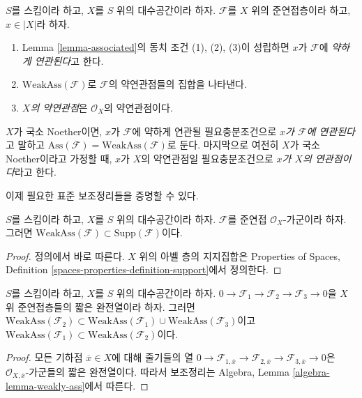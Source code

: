 \begin{definition}
\label{definition-weakly-associated}
$S$를 스킴이라 하고, $X$를 $S$ 위의 대수공간이라 하자.
$\mathcal{F}$를 $X$ 위의 준연접층이라 하고, $x \in |X|$라 하자.
\begin{enumerate}
\item Lemma \ref{lemma-associated}의 동치 조건 (1), (2), (3)이
성립하면 $x$가 $\mathcal{F}$에 {\it 약하게 연관된다}고 한다.
\item $\text{WeakAss}(\mathcal{F})$로 $\mathcal{F}$의
약연관점들의 집합을 나타낸다.
\item {\it $X$의 약연관점}은 $\mathcal{O}_X$의 약연관점이다.
\end{enumerate}
$X$가 국소 Noether이면, $x$가 $\mathcal{F}$에 약하게 연관될 필요충분조건으로
{\it $x$가 $\mathcal{F}$에 연관된다}고 말하고
$\text{Ass}(\mathcal{F}) = \text{WeakAss}(\mathcal{F})$로 둔다.
마지막으로 여전히 $X$가 국소 Noether이라고 가정할 때,
$x$가 $X$의 약연관점일 필요충분조건으로
{\it $x$가 $X$의 연관점이다}라고 한다.
\end{definition}

\noindent
이제 필요한 표준 보조정리들을 증명할 수 있다.

\begin{lemma}
\label{lemma-weakly-ass-support}
$S$를 스킴이라 하고, $X$를 $S$ 위의 대수공간이라 하자.
$\mathcal{F}$를 준연접 $\mathcal{O}_X$-가군이라 하자. 그러면
$\text{WeakAss}(\mathcal{F}) \subset \text{Supp}(\mathcal{F})$이다.
\end{lemma}

\begin{proof}
정의에서 바로 따른다. $X$ 위의 아벨 층의 지지집합은
Properties of Spaces, Definition
\ref{spaces-properties-definition-support}에서 정의한다.
\end{proof}

\begin{lemma}
\label{lemma-ses-weakly-ass}
$S$를 스킴이라 하고, $X$를 $S$ 위의 대수공간이라 하자.
$0 \to \mathcal{F}_1 \to \mathcal{F}_2 \to \mathcal{F}_3 \to 0$을
$X$ 위 준연접층들의 짧은 완전열이라 하자. 그러면
$\text{WeakAss}(\mathcal{F}_2) \subset
\text{WeakAss}(\mathcal{F}_1) \cup \text{WeakAss}(\mathcal{F}_3)$이고
$\text{WeakAss}(\mathcal{F}_1) \subset \text{WeakAss}(\mathcal{F}_2)$이다.
\end{lemma}

\begin{proof}
모든 기하점 $\overline{x} \in X$에 대해 줄기들의 열
$0 \to \mathcal{F}_{1, \overline{x}} \to
\mathcal{F}_{2, \overline{x}} \to
\mathcal{F}_{3, \overline{x}} \to 0$은
$\mathcal{O}_{X, \overline{x}}$-가군들의 짧은 완전열이다.
따라서 보조정리는 Algebra, Lemma
\ref{algebra-lemma-weakly-ass}에서 따른다.
\end{proof}

